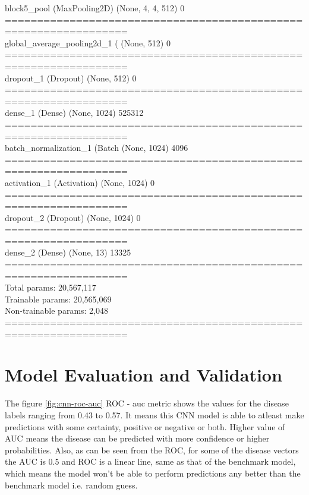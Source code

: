 \documentclass{article}
\begin{document}
{\begin{minipage}{\textwidth}
        block5\_pool (MaxPooling2D)   (None, 4, 4, 512)         0 \\ 
        ================================================================= \\ 
        global\_average\_pooling2d\_1 ( (None, 512)               0 \\ 
        ================================================================= \\ 
        dropout\_1 (Dropout)          (None, 512)               0 \\ 
        ================================================================= \\ 
        dense\_1 (Dense)              (None, 1024)              525312 \\ 
        ================================================================= \\ 
        batch\_normalization\_1 (Batch (None, 1024)              4096 \\ 
        ================================================================= \\ 
        activation\_1 (Activation)    (None, 1024)              0 \\ 
        ================================================================= \\ 
        dropout\_2 (Dropout)          (None, 1024)              0 \\ 
        ================================================================= \\ 
        dense\_2 (Dense)              (None, 13)                13325 \\ 
        ================================================================= \\ 
        Total params: 20,567,117 \\ 
        Trainable params: 20,565,069 \\ 
        Non-trainable params: 2,048 \\ 
        =================================================================
    \end{minipage}}

    \section{Model Evaluation and Validation}
    The figure \ref{fig:cnn-roc-auc} ROC - auc metric shows the values for the disease labels ranging from 0.43 to 0.57. It means this CNN model is able to atleast make predictions with some certainty, positive or negative or both. Higher value of AUC means the disease can be predicted with more confidence or higher probabilities. Also, as can be seen from the ROC, for some of the disease vectors the AUC is 0.5 and ROC is a linear line, same as that of the benchmark model, which means the model won't be able to perform predictions any better than the benchmark model i.e. random guess.
\end{document}
